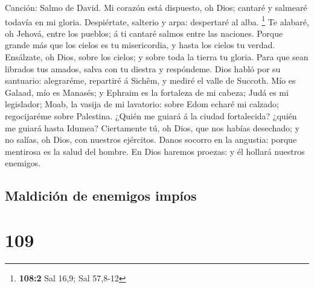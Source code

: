  Canción: Salmo de David. Mi corazón está dispuesto, oh
Dios; cantaré y salmearé todavía en mi gloria.  Despiértate,
salterio y arpa: despertaré al alba. \footnote{\textbf{108:2} Sal 16,9;
  Sal 57,8-12}  Te alabaré, oh Jehová, entre los pueblos; á
ti cantaré salmos entre las naciones.  Porque grande más que
los cielos es tu misericordia, y hasta los cielos tu verdad.
 Ensálzate, oh Dios, sobre los cielos; y sobre toda la
tierra tu gloria.  Para que sean librados tus amados, salva
con tu diestra y respóndeme.  Dios habló por su santuario:
alegraréme, repartiré á Sichêm, y mediré el valle de Succoth.
 Mío es Galaad, mío es Manasés; y Ephraim es la fortaleza de
mi cabeza; Judá es mi legislador;  Moab, la vasija de mi
lavatorio: sobre Edom echaré mi calzado; regocijaréme sobre Palestina.
 ¿Quién me guiará á la ciudad fortalecida? ¿quién me guiará
hasta Idumea?  Ciertamente tú, oh Dios, que nos habías
desechado; y no salías, oh Dios, con nuestros ejércitos. 
Danos socorro en la angustia: porque mentirosa es la salud del hombre.
 En Dios haremos proezas: y él hollará nuestros enemigos.

\hypertarget{maldiciuxf3n-de-enemigos-impuxedos}{%
\subsection{Maldición de enemigos
impíos}\label{maldiciuxf3n-de-enemigos-impuxedos}}

\hypertarget{section-108}{%
\section{109}\label{section-108}}

